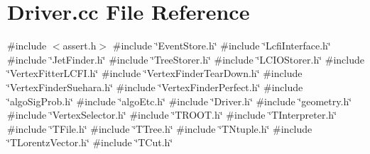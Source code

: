\section{Driver.\+cc File Reference}
\label{Driver_8cc}
{\ttfamily \#include $<$assert.\+h$>$}\newline
{\ttfamily \#include \char`\"{}Event\+Store.\+h\char`\"{}}\newline
{\ttfamily \#include \char`\"{}Lcfi\+Interface.\+h\char`\"{}}\newline
{\ttfamily \#include \char`\"{}Jet\+Finder.\+h\char`\"{}}\newline
{\ttfamily \#include \char`\"{}Tree\+Storer.\+h\char`\"{}}\newline
{\ttfamily \#include \char`\"{}L\+C\+I\+O\+Storer.\+h\char`\"{}}\newline
{\ttfamily \#include \char`\"{}Vertex\+Fitter\+L\+C\+F\+I.\+h\char`\"{}}\newline
{\ttfamily \#include \char`\"{}Vertex\+Finder\+Tear\+Down.\+h\char`\"{}}\newline
{\ttfamily \#include \char`\"{}Vertex\+Finder\+Suehara.\+h\char`\"{}}\newline
{\ttfamily \#include \char`\"{}Vertex\+Finder\+Perfect.\+h\char`\"{}}\newline
{\ttfamily \#include \char`\"{}algo\+Sig\+Prob.\+h\char`\"{}}\newline
{\ttfamily \#include \char`\"{}algo\+Etc.\+h\char`\"{}}\newline
{\ttfamily \#include \char`\"{}Driver.\+h\char`\"{}}\newline
{\ttfamily \#include \char`\"{}geometry.\+h\char`\"{}}\newline
{\ttfamily \#include \char`\"{}Vertex\+Selector.\+h\char`\"{}}\newline
{\ttfamily \#include \char`\"{}T\+R\+O\+O\+T.\+h\char`\"{}}\newline
{\ttfamily \#include \char`\"{}T\+Interpreter.\+h\char`\"{}}\newline
{\ttfamily \#include \char`\"{}T\+File.\+h\char`\"{}}\newline
{\ttfamily \#include \char`\"{}T\+Tree.\+h\char`\"{}}\newline
{\ttfamily \#include \char`\"{}T\+Ntuple.\+h\char`\"{}}\newline
{\ttfamily \#include \char`\"{}T\+Lorentz\+Vector.\+h\char`\"{}}\newline
{\ttfamily \#include \char`\"{}T\+Cut.\+h\char`\"{}}\newline

